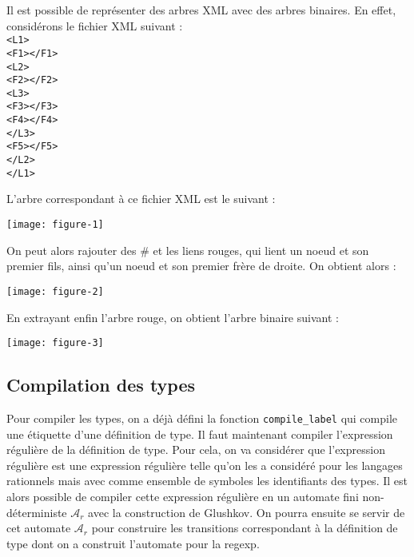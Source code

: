 \documentclass[a4paper, 11pt]{article}
\begin{document}
Il est possible de représenter des arbres XML avec des arbres binaires.
En effet, considérons le fichier XML suivant :
\\\texttt{<L1>}
\\\null\quad \texttt{<F1></F1>}
\\\null\quad \texttt{<L2>}
\\\null\qquad \texttt{<F2></F2>}
\\\null\qquad \texttt{<L3>}
\\\null\qquad\quad \texttt{<F3></F3>}
\\\null\qquad\quad \texttt{<F4></F4>}
\\\null\qquad \texttt{</L3>}
\\\null\qquad \texttt{<F5></F5>}
\\\null\quad \texttt{</L2>}
\\\texttt{</L1>}

L'arbre correspondant à ce fichier XML est le suivant :\\
\begin{center}
  \texttt{[image: figure-1]}
\end{center}

On peut alors rajouter des $\#$ et les liens rouges, qui lient un noeud et son
premier fils, ainsi qu'un noeud et son premier frère de droite. On obtient
alors :\\
\begin{center}
  \texttt{[image: figure-2]}
\end{center}

En extrayant enfin l'arbre rouge, on obtient l'arbre binaire suivant :\\
\begin{center}
  \texttt{[image: figure-3]}
\end{center}

\subsection*{Compilation des types}

Pour compiler les types, on a déjà défini la fonction \texttt{compile\_label}
qui compile une étiquette d'une définition de type. Il faut maintenant compiler
l'expression régulière de la définition de type. Pour cela, on va considérer que
l'expression régulière est une expression régulière telle qu'on les a considéré
pour les langages rationnels mais avec comme ensemble de symboles les
identifiants des types. Il est alors possible de compiler cette expression
régulière en un automate fini non-déterministe $\mathcal{A}_r$ avec la
construction de Glushkov. On pourra ensuite se servir de cet automate
$\mathcal{A}_r$ pour construire les transitions correspondant à la définition de
type dont on a construit l'automate pour la regexp.
\end{document}
